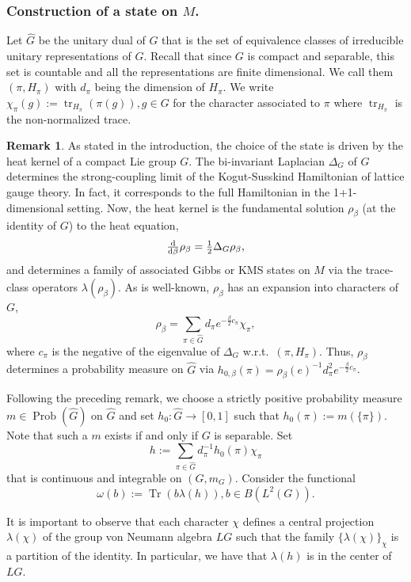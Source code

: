 \documentclass[a4paper,12pt]{amsart}
\numberwithin{equation}{section}
\theoremstyle{definition}
\newtheorem{remark}[theo]{Remark}
\newcommand{\la}{\lambda}
\DeclareMathOperator{\Prob}{Prob}
\DeclareMathOperator{\tr}{tr}
\DeclareMathOperator{\Tr}{Tr}
\newcommand{\wh}{\widehat}
\begin{document}
\subsubsection{Construction of a state on $M$.}
Let $\wh G$ be the unitary dual of $G$ that is the set of equivalence classes of irreducible unitary representations of $G$.
Recall that since $G$ is compact and separable, this set is countable and all the representations are finite dimensional.
We call them $(\pi,H_\pi)$ with $d_\pi$ being the dimension of $H_\pi$. We write $\chi_\pi(g):= \tr_{H_\pi}(\pi(g)), g\in G$ for the character associated to $\pi$ where $\tr_{H_{\pi}}$ is the non-normalized trace.

\begin{remark}
\label{rem:heatkernel}
As stated in the introduction, the choice of the state is driven by the heat kernel of a compact Lie group $G$. The bi-invariant Laplacian $\Delta_{G}$ of $G$ determines the strong-coupling limit of the Kogut-Susskind Hamiltonian of lattice gauge theory. In fact, it corresponds to the full Hamiltonian in the 1+1-dimensional setting. Now, the heat kernel is the fundamental solution $\rho_{\beta}$ (at the identity of $G$) to the heat equation,
$$\tfrac{\textup{d}}{\textup{d}\beta}\rho_{\beta} = \tfrac{1}{2}\Delta_{G}\rho_{\beta},$$
and determines a family of associated Gibbs or KMS states on $M$ via the trace-class operators $\lambda(\rho_{\beta})$. As is well-known, $\rho_{\beta}$ has an expansion into characters of $G$,
$$\rho_{\beta} = \sum_{\pi\in\wh G}d_{\pi}e^{-\frac{\beta}{2}c_{\pi}}\chi_{\pi},$$
where $c_{\pi}$ is the negative of the eigenvalue of $\Delta_{G}$ w.r.t.~$(\pi, H_{\pi})$. Thus, $\rho_{\beta}$ determines a probability measure on $\wh G$ via $h_{0,\beta}(\pi) = \rho_{\beta}(e)^{-1}d^{2}_{\pi}e^{-\frac{\beta}{2}c_{\pi}}$.
\end{remark}

Following the preceding remark, we choose a strictly positive probability measure $m\in \Prob(\wh G)$ on $\wh G$ and set $h_0:\wh G\to [0,1]$ such that $h_0(\pi):=m(\{ \pi \}).$
Note that such a $m$ exists if and only if $G$ is separable.
Set $$h:=\sum_{\pi \in \wh G} d_\pi^{-1} h_0(\pi) \chi_\pi$$ that is continuous and integrable on $(G,m_G).$
Consider the functional $$\omega(b):=\Tr(b\la(h)),b\in B(L^2(G)).$$

It is important to observe that each character $\chi$ defines a central projection $\la(\chi)$ of the group von Neumann algebra $LG$ such that the family $\{\la(\chi)\}_{\chi}$ is a partition of the identity.
In particular, we have that $\la(h)$ is in the center of $LG.$
\end{document}
